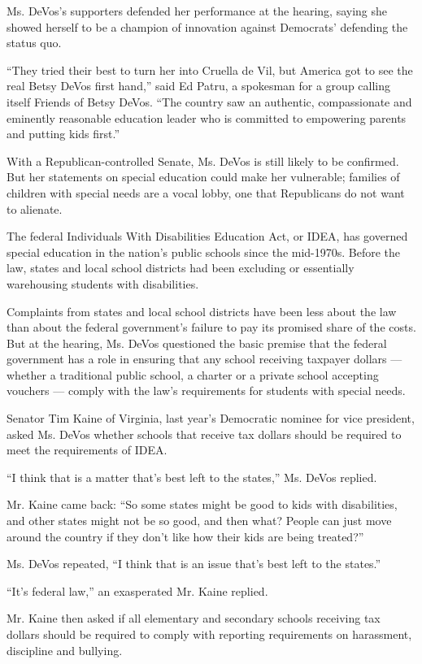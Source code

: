 Ms. DeVos's supporters defended her performance at the hearing, saying
she showed herself to be a champion of innovation against Democrats'
defending the status quo.

``They tried their best to turn her into Cruella de Vil, but America got
to see the real Betsy DeVos first hand,'' said Ed Patru, a spokesman for
a group calling itself Friends of Betsy DeVos. ``The country saw an
authentic, compassionate and eminently reasonable education leader who
is committed to empowering parents and putting kids first.''

With a Republican-controlled Senate, Ms. DeVos is still likely to be
confirmed. But her statements on special education could make her
vulnerable; families of children with special needs are a vocal lobby,
one that Republicans do not want to alienate.

The federal Individuals With Disabilities Education Act, or IDEA, has
governed special education in the nation's public schools since the
mid-1970s. Before the law, states and local school districts had been
excluding or essentially warehousing students with disabilities.

Complaints from states and local school districts have been less about
the law than about the federal government's failure to pay its promised
share of the costs. But at the hearing, Ms. DeVos questioned the basic
premise that the federal government has a role in ensuring that any
school receiving taxpayer dollars --- whether a traditional public
school, a charter or a private school accepting vouchers --- comply with
the law's requirements for students with special needs.

Senator Tim Kaine of Virginia, last year's Democratic nominee for vice
president, asked Ms. DeVos whether schools that receive tax dollars
should be required to meet the requirements of IDEA.

``I think that is a matter that's best left to the states,'' Ms. DeVos
replied.

Mr. Kaine came back: ``So some states might be good to kids with
disabilities, and other states might not be so good, and then what?
People can just move around the country if they don't like how their
kids are being treated?''

Ms. DeVos repeated, ``I think that is an issue that's best left to the
states.''

``It's federal law,'' an exasperated Mr. Kaine replied.

Mr. Kaine then asked if all elementary and secondary schools receiving
tax dollars should be required to comply with reporting requirements on
harassment, discipline and bullying.

